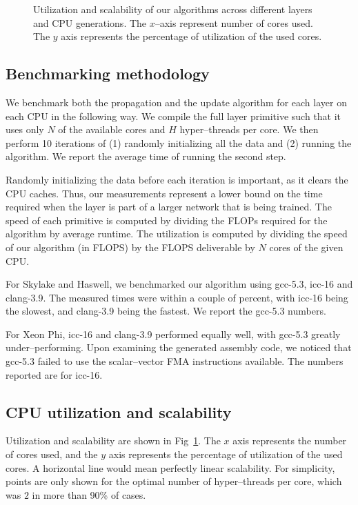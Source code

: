 \begin{figure}
\begin{tabular}{ >{\centering\arraybackslash}c ccccccl }
    \end{tabular}
    \caption{Utilization and scalability of our algorithms across
      different layers and CPU generations.  The $x$--axis represent
      number of cores used.  The $y$ axis represents the percentage of
      utilization of the used cores.}
    \label{fig:scalability}
  \end{figure}

  \subsection{Benchmarking methodology}

  We benchmark both the propagation and the update algorithm for each
  layer on each CPU in the following way.  We compile the full layer
  primitive such that it uses only $N$ of the available cores and $H$
  hyper--threads per core.  We then perform 10 iterations of (1)
  randomly initializing all the data and (2) running the algorithm.
  We report the average time of running the second step.

  Randomly initializing the data before each iteration is important,
  as it clears the CPU caches.  Thus, our measurements represent a
  lower bound on the time required when the layer is part of a larger
  network that is being trained.  The speed of each primitive is
  computed by dividing the FLOPs required for the algorithm by
  average runtime.  The utilization is computed by dividing the speed
  of our algorithm (in FLOPS) by the FLOPS deliverable by $N$ cores of
  the given CPU.

  For Skylake and Haswell, we benchmarked our algorithm
  using gcc-5.3, icc-16 and clang-3.9.  The measured times were within
  a couple of percent, with icc-16 being the slowest, and clang-3.9
  being the fastest.  We report the gcc-5.3 numbers.

  For Xeon Phi, icc-16 and clang-3.9 performed equally well, with
  gcc-5.3 greatly under--performing.  Upon examining the generated
  assembly code, we noticed that gcc-5.3 failed to use the
  scalar--vector FMA instructions available.  The numbers reported are
  for icc-16.

  \subsection{CPU utilization and scalability}

  Utilization and scalability are shown in Fig~\ref{fig:scalability}.
  The $x$ axis represents the number of cores used, and the $y$ axis
  represents the percentage of utilization of the used cores.  A
  horizontal line would mean perfectly linear scalability.  For
  simplicity, points are only shown for the optimal number
  of hyper--threads per core, which was $2$ in more than 90\% of cases.

